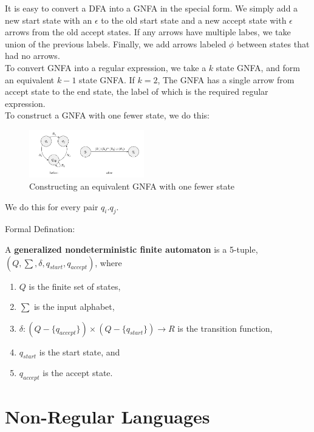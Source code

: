 It is easy to convert a DFA into a GNFA in the special form. We simply add a
new start state with an $\epsilon$ to the old start state and a new accept
state with $\epsilon$ arrows from the old accept states. If any arrows have
multiple labes, we take union of the previous labels. Finally, we add arrows
labeled $\phi$ between states that had no arrows.\\

To convert GNFA into a regular expression, we take a $k$ state GNFA, and form 
an equivalent $k - 1$ state GNFA. If $k = 2$, The GNFA has a single arrow
from accept state to the end state, the label of which is the required 
regular expression.\\

To construct a GNFA with one fewer state, we do this:

\begin{figure}[h!]
    \begin{center}
        \includegraphics[width=5cm]{img/163.png}
        \caption{Constructing an equivalent GNFA with one fewer state}
    \end{center}
\end{figure}

We do this for every pair $q_i. q_j$.

Formal Defination:

\begin{defination}
    A \textbf{generalized nondeterministic finite automaton} is a 5-tuple,
    $(Q, \sum, \delta, q_{start}, q_{accept})$, where
    \begin{enumerate}
        \item $Q$ is the finite set of states,
        \item $\sum$ is the input alphabet,
        \item $\delta: (Q - \{q_{accept}\}) \times (Q - \{q_{start}\}) 
            \rightarrow R$ is the transition function,
        \item $q_{start}$ is the start state, and
        \item $q_{accept}$ is the accept state.
    \end{enumerate}
\end{defination}

\section{Non-Regular Languages}

